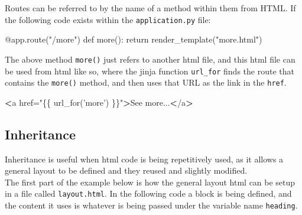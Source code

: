 \documentclass[]{book}
\newenvironment{Shaded}{\begin{snugshade}}{\end{snugshade}}
\newcommand{\StringTok}[1]{\textcolor[rgb]{0.31,0.60,0.02}{#1}}
\newcommand{\OperatorTok}[1]{\textcolor[rgb]{0.81,0.36,0.00}{\textbf{#1}}}
\newcommand{\BuiltInTok}[1]{#1}
\newcommand{\ExtensionTok}[1]{#1}
\newcommand{\NormalTok}[1]{#1}
\begin{document}
Routes can be referred to by the name of a method within them from HTML.
If the following code exists within the \texttt{application.py} file:

\begin{Shaded}
\begin{Highlighting}[]
\ExtensionTok{@app.route}\NormalTok{(}\StringTok{"/more"}\NormalTok{)}
\ExtensionTok{def}\NormalTok{ more()}\BuiltInTok{:}
    \BuiltInTok{return}\NormalTok{ render_template(}\StringTok{"more.html"}\NormalTok{)}
\end{Highlighting}
\end{Shaded}

The above method \texttt{more()} just refers to another html file, and
this html file can be used from html like so, where the jinja function
\texttt{url\_for} finds the route that contains the \texttt{more()}
method, and then uses that URL as the link in the \texttt{href}.

\begin{Shaded}
\begin{Highlighting}[]
\OperatorTok{<}\ExtensionTok{a}\NormalTok{ href=}\StringTok{"\{\{ url_for('more') \}\}"}\OperatorTok{>}\NormalTok{See more...}\OperatorTok{<}\NormalTok{/a}\OperatorTok{>}
\end{Highlighting}
\end{Shaded}

\subsection{Inheritance}\label{inheritance-1}

Inheritance is useful when html code is being repetitively used, as it
allows a general layout to be defined and they reused and slightly
modified.\\
The first part of the example below is how the general layout html can
be setup in a file called \texttt{layout.html}. In the following code a
block is being defined, and the content it uses is whatever is being
passed under the variable name \texttt{heading}.

\begin{Shaded}
\end{Shaded}
\end{document}
